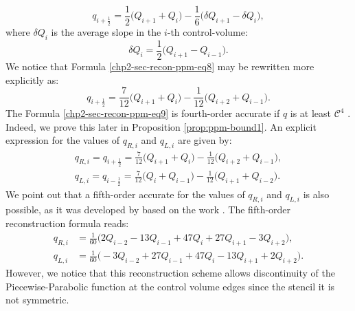 \begin{equation}
	\label{chp2-sec-recon-ppm-eq7}
	q_{i+\frac{1}{2}} = \frac{1}{2} \bigg( Q_{i+1} + Q_{i} \bigg) - \frac{1}{6} \bigg( \delta Q_{i+1} - \delta Q_{i}\bigg),
\end{equation}
where $\delta Q_{i}$ is the average slope in the $i$-th control-volume:
\begin{equation}
	\label{chp2-sec-recon-ppm-eq8}
	\delta Q_{i} = \frac{1}{2} \bigg( Q_{i+1} - Q_{i-1} \bigg).
\end{equation}
We notice that Formula \eqref{chp2-sec-recon-ppm-eq8} may be rewritten more explicitly as:
\begin{equation}
	\label{chp2-sec-recon-ppm-eq9}
	q_{i+\frac{1}{2}} = \frac{7}{12} \bigg( Q_{i+1} + Q_{i} \bigg) - \frac{1}{12} \bigg(  Q_{i+2} +Q_{i-1}\bigg).
\end{equation}
The Formula \eqref{chp2-sec-recon-ppm-eq9} is fourth-order accurate if
$q$ is at least $\mathcal{C}^4$ \citep{colella:1984}. Indeed, we
prove this later in Proposition \ref{prop:ppm-bound1}.
An explicit expression for the values of $q_{R,i}$ and $q_{L,i}$ are given by:
\begin{align}
	\label{chp2-sec-recon-ppm-eq10}
	q_{R,i} = q_{i+\frac{1}{2}} = \frac{7}{12} \bigg( Q_{i+1} + Q_{i} \bigg) - \frac{1}{12} \bigg(  Q_{i+2} +Q_{i-1}\bigg), \\
	\label{chp2-sec-recon-ppm-eq11}
	q_{L,i} = q_{i-\frac{1}{2}} = \frac{7}{12} \bigg( Q_{i} + Q_{i-1} \bigg) - \frac{1}{12} \bigg(  Q_{i+1} +Q_{i-2}\bigg).
\end{align}
We point out that a fifth-order accurate for the values of $q_{R,i}$ and $q_{L,i}$
is also possible, as it was developed by \citet{putman:2007} 
based on the work \citet{suresh:1997}. The fifth-order reconstruction formula reads:
\begin{align}
	\label{chp2-sec-recon-ppm-eq12}
	q_{R,i} &= \frac{1}{60} \bigg( 2Q_{i-2} - 13Q_{i-1} + 47Q_{i} + 27Q_{i+1} - 3Q_{i+2}\bigg), \\
	\label{chp2-sec-recon-ppm-eq13}
	q_{L,i} &= \frac{1}{60} \bigg(-3Q_{i-2} + 27Q_{i-1} + 47Q_{i} - 13Q_{i+1} + 2Q_{i+2}\bigg).
\end{align}
However, we notice that this reconstruction scheme allows discontinuity of the 
Piecewise-Parabolic function at the control volume edges since the stencil it is not symmetric.

